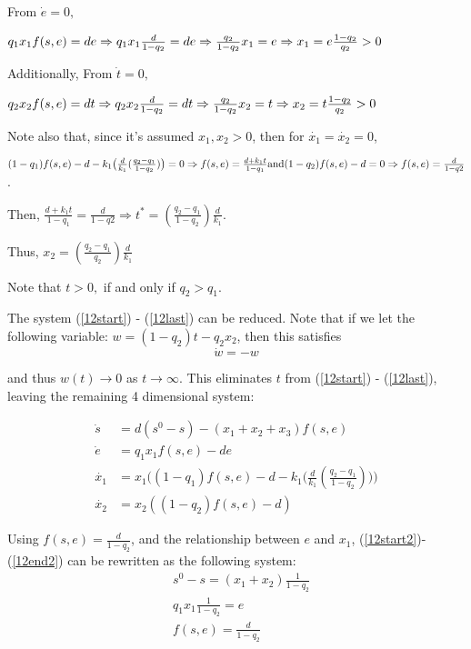 \documentclass[12pt]{article}
\begin{document}
\noindent From $\dot{e}=0,$  

\noindent $q_1 x_1 f(s,e) = de \\ 
\Rightarrow q_1 x_1 \frac{d}{1-q_2} =de \\ 
\Rightarrow \frac{q_2}{1-q_2}x_1=e \\ 
\Rightarrow x_1=e \frac{1-q_2}{q_2} >0$

\noindent Additionally, From $\dot{t}=0,$  

\noindent $q_2 x_2 f(s,e) = dt \\ 
\Rightarrow q_2 x_2 \frac{d}{1-q_2} =dt \\ 
\Rightarrow \frac{q_2}{1-q_2}x_2=t \\ 
\Rightarrow x_2=t \frac{1-q_2}{q_2} >0$

\noindent Note also that, since it's assumed $x_1, x_2>0$, then for $\dot{x_1}=\dot{x_2}=0$, 

$(1-q_1)f(s,e)-d- k_1 \big( \frac{d}{k_1}(\frac{q_2-q_1}{1-q_2})\big)=0 \\
\Rightarrow f(s,e) =\frac{d+k_1 t}{1-q_1}\\
\text{and}\\
(1-q_2)f(s,e)-d=0\\
\Rightarrow f(s,e)=\frac{d}{1-q2}$. 

\noindent Then, $\frac{d+k_1 t}{1-q_1}= \frac{d}{1-q2} \Rightarrow t^*=(\frac{q_2 - q_1}{1-q_2})\frac{d}{k_1}$.

\noindent Thus, $x_2=(\frac{q_2 - q_1}{q_2})\frac{d}{k_1}$

\noindent Note that $t>0,$ if and only if $q_2 > q_1$. 

\noindent The system (\ref{12start}) - (\ref{12last}) can be reduced. Note that if we let the following variable: $w=(1-q_2)t-q_2 x_2$, then this satisfies $$\dot{w}=-w$$

\noindent and thus $w(t)\rightarrow 0$ as $t\rightarrow \infty$. This eliminates $t$ from (\ref{12start}) - (\ref{12last}), leaving the remaining 4 dimensional system: 

\begin{align}
\dot{s}&=d(s^0-s)-(x_1 + x_2+x_3) f(s,e) \label{12start2} \\
\dot{e}&=q_1 x_1 f(s,e)-de\\
\dot{x_1} &= x_1\bigg( (1-q_1)f(s,e)-d- k_1 \big( \frac{d}{k_1}(\frac{q_2-q_1}{1-q_2})\big) \bigg)\\
\dot{x_2}&=x_2((1-q_2)f(s,e)-d) \label{12end2}
\end{align}

\noindent Using $f(s,e)=\frac{d}{1-q_2}$, and the relationship between $e$ and $x_1$, (\ref{12start2})-(\ref{12end2}) can be rewritten as the following system: 
\begin{align}
&s^0-s=(x_1+x_2)\frac{1}{1-q_2} \label{x12two-s}\\
&q_1 x_1 \frac{1}{1-q_2}= e\\
&f(s,e) = \frac{d}{1-q_2}
\end{align}
\end{document}
